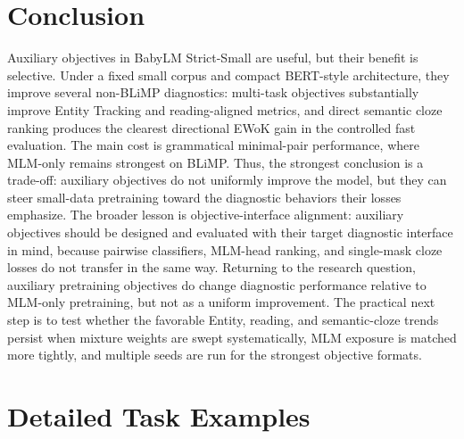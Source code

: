 \documentclass[11pt]{article}
\begin{document}
\section{Conclusion}

Auxiliary objectives in BabyLM Strict-Small are useful, but their benefit is selective.
Under a fixed small corpus and compact BERT-style architecture, they improve several non-BLiMP diagnostics: multi-task objectives substantially improve Entity Tracking and reading-aligned metrics, and direct semantic cloze ranking produces the clearest directional EWoK gain in the controlled fast evaluation.
The main cost is grammatical minimal-pair performance, where MLM-only remains strongest on BLiMP.
Thus, the strongest conclusion is a trade-off: auxiliary objectives do not uniformly improve the model, but they can steer small-data pretraining toward the diagnostic behaviors their losses emphasize.
The broader lesson is objective-interface alignment: auxiliary objectives should be designed and evaluated with their target diagnostic interface in mind, because pairwise classifiers, MLM-head ranking, and single-mask cloze losses do not transfer in the same way.
Returning to the research question, auxiliary pretraining objectives do change diagnostic performance relative to MLM-only pretraining, but not as a uniform improvement.
The practical next step is to test whether the favorable Entity, reading, and semantic-cloze trends persist when mixture weights are swept systematically, MLM exposure is matched more tightly, and multiple seeds are run for the strongest objective formats.



\appendix
\section{Detailed Task Examples}
\label{app:task-details}
\end{document}
